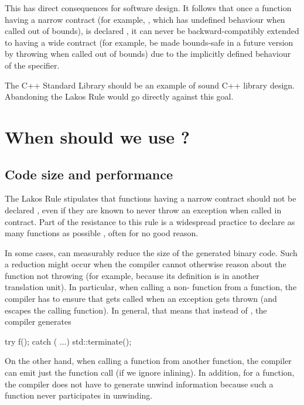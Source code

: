 This has direct consequences for software design. It follows that once a function having a narrow contract (for example, , which has undefined behaviour when called out of bounds), is declared , it can never be backward-compatibly extended to having a wide contract (for example, be made bounds-safe in a future version by throwing when called out of bounds) due to the implicitly defined behaviour of the  specifier. 

The C++ Standard Library should be an example of sound C++ library design. Abandoning the Lakos Rule would go directly against this goal.

\section{When should we use ?}
\label{sec:noexcept}

\subsection{Code size and performance}

The Lakos Rule stipulates that functions having a narrow contract should not be declared , even if they are known to never throw an exception when called in contract. Part of the resistance to this rule is a widespread practice to declare as many functions as possible , often for no good reason.

In some cases,  can measurably reduce the size of the generated binary code. Such a reduction might occur when the compiler cannot otherwise reason about the function not throwing (for example, because its definition is in another translation unit). In particular, when calling a non- function  from a  function, the compiler has to ensure that  gets called when an exception gets thrown (and escapes the calling function). In general, that means that instead of , the compiler generates
\begin{codeblock}
try { f(); } catch ( ...) { std::terminate(); }
\end{codeblock}
On the other hand, when calling a  function from another  function, the compiler can emit just the function call (if we ignore inlining). In addition, for a  function, the compiler does not have to generate unwind information because such a function never participates in unwinding.

